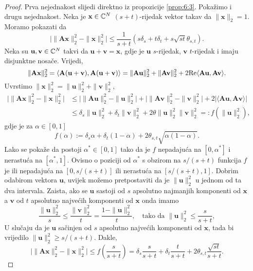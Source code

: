 \documentclass[a4paper,twoside,12pt]{memoir} %
\newcommand{\vect}[1]{\mathbf{#1}}
\renewcommand{\vec}{\vect}
\newcommand{\norm}[1]{\|{#1}\|}
\renewcommand{\Re}{\text{\normalfont{Re}}}
\begin{document}
\begin{proof}
    Prva nejednakost slijedi direktno iz propozicije \ref{prop:6:3}. Poka\v{z}imo i drugu nejednakost. Neka je $\vec x \in \C^N$ $(s+t)$-rijedak vektor takav da $\norm{\vec x}_2 = 1$. Moramo pokazati da
    \begin{equation*}
        \big |\norm{\vec{Ax}}_2^2 - \norm{\vec x}_2^2 \big |  \leq \frac{1}{s+t} (s \delta_s + t \delta_t + s \sqrt{st} \theta_{s,t}).
    \end{equation*}
    Neka su $\vec u, \vec v \in \C^N$ takvi da $\vec u + \vec v = \vec x$, gdje je $\vec u$ $s$-rijedak, $\vec v$ $t$-rijedak i imaju disjunktne nosa\v{c}e. Vrijedi, 
    \begin{equation*}
        \norm{\vec{Ax}}_2^2 = \langle \vec A(\vec u + \vec v) , \vec A(\vec u + \vec v) \rangle = \norm{\vec{Au}}_2^2 + \norm{\vec{Av}}_2^2 + 2 \Re \langle \vec{Au}, \vec{Av} \rangle.
    \end{equation*}
    Uvrstimo $\norm{\vec x}_2^2 = \norm{\vec u}_2^2 + \norm{\vec v}_2^2$,
    \begin{align*}
        \big |\norm{\vec{Ax}}_2^2 - \norm{\vec x}_2^2 \big | &\leq \big |\norm{\vec{Au}}_2^2 - \norm{\vec u }_2^2 \big | + \big |\norm{\vec{Av}}_2^2 - \norm{\vec v}_2^2 \big | + 2 \big |\langle  \vec{Au}, \vec{Av} \rangle \big | \\
        &\leq \delta_s \norm{\vec u }_2^2 + \delta_t \norm{\vec v }_2^2 + 2 \theta \norm{\vec u}_2^2 \norm{\vec v }_2^2 =: f(\norm{\vec u}^2_2),
    \end{align*}
    gdje je za $\alpha \in [0,1]$
    \begin{equation}\label{6:6}
        f(\alpha) := \delta_s \alpha + \delta_t(1-\alpha) + 2 \theta_{s,t} \sqrt{\alpha(1- \alpha)}.
    \end{equation}
    Lako se poka\v{z}e da postoji $\alpha^* \in [0,1]$ tako da je $f$ nepadaju\'ca na $[0, \alpha^*]$ i nerastu\'ca na $[\alpha^*, 1]$. Ovisno o poziciji od $\alpha^*$ s obzirom na $s/(s+t)$ funkcija $f$ je ili nepadaju\'ca na $[0, s/(s+t)]$ ili nerastu\'ca na $[s/(s+t), 1]$. Dobrim odabirom vektora $\vec u$, uvijek mo\v{z}emo pretpostaviti da je $\norm{\vec u}_2^2$ u jednom od ta dva intervala. Zaista, ako se $\vec u$ sastoji od $s$ apsolutno najmanjih komponenti od $\vec x$ a $\vec v$ od $t$ apsolutno najve\'cih komponenti od $\vec x$ onda imamo
    \begin{equation*}
        \frac{\norm{\vec u}_2^2}{s} \leq \frac{\norm{\vec v}_2^2}{t} = \frac{1 - \norm{\vec u}_2^2}{t}, \quad \text{tako da } \norm{\vec u}_2^2 \leq \frac{s}{s+t},     
    \end{equation*}
    U slu\v{c}aju da je $\vec u$ sa\v{c}injen od $s$ apsolutno najve\'cih komponenti od $\vec x$, tada bi vrijedilo $\norm{\vec u}_2^2 \geq s/(s+t)$. Dakle, 
    \begin{equation*}
        \big | \norm{\vec{Ax}}_2^2 - \norm{\vec x}_2^2 \big | \leq f(\frac{s}{s+t}) = \delta_s \frac{s}{s+t} + \delta_t \frac{t}{s+t} + 2 \theta_{s,t} \frac{\sqrt{st}}{s+t} .
    \end{equation*}
\end{proof}
\end{document}
